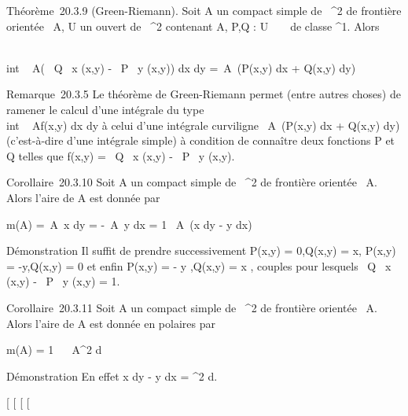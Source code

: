 Théorème~20.3.9 (Green-Riemann). Soit A un compact simple de
~^2 de frontière orientée \partial~A, U un ouvert de ~^2
contenant A, P,Q : U \rightarrow~ ~ de classe ^1. Alors

\int  \\int ~
A\left ( \partial~Q \over \partial~x (x,y) -
\partial~P \over \partial~y (x,y)\right ) dx dy
=\int  \partial~A~(P(x,y) dx + Q(x,y) dy)

Remarque~20.3.5 Le théorème de Green-Riemann permet (entre autres
choses) de ramener le calcul d'une intégrale du type
\int  \\int ~
Af(x,y) dx dy à celui d'une intégrale curviligne
\int  \partial~A~(P(x,y) dx + Q(x,y) dy)
(c'est-à-dire d'une intégrale simple) à condition de connaître deux
fonctions P et Q telles que f(x,y) = \partial~Q \over \partial~x
(x,y) - \partial~P \over \partial~y (x,y).

Corollaire~20.3.10 Soit A un compact simple de ~^2 de
frontière orientée \partial~A. Alors l'aire de A est donnée par

m(A) =\int  \partial~A~x dy =
-\int  \partial~A~y dx = 1
 \int  \partial~A~(x dy
- y dx)

Démonstration Il suffit de prendre successivement P(x,y) = 0,Q(x,y) = x,
P(x,y) = -y,Q(x,y) = 0 et enfin P(x,y) = - y 
,Q(x,y) = x  , couples pour lesquels  \partial~Q
\over \partial~x (x,y) - \partial~P \over \partial~y (x,y) =
1.

Corollaire~20.3.11 Soit A un compact simple de ~^2 de
frontière orientée \partial~A. Alors l'aire de A est donnée en polaires par

m(A) = 1  \int ~
\partial~A\rho^2 d\theta

Démonstration En effet x dy - y dx = \rho^2 d\theta.

{[}
{[}
{[}
{[}
